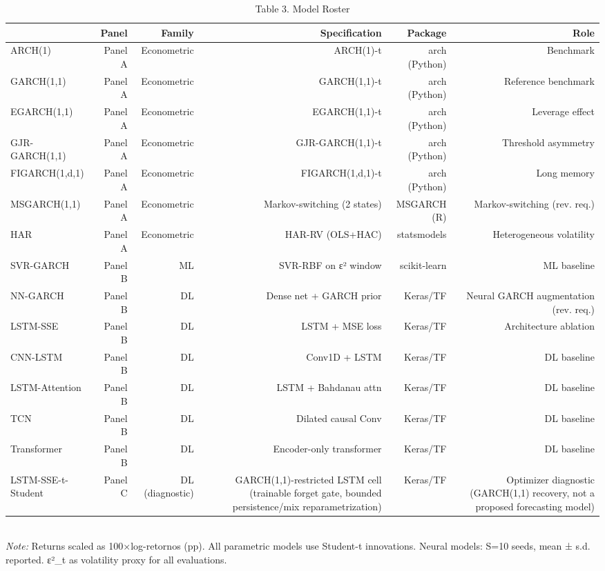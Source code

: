 \begin{table}[ht]
\centering
\caption{Table 3. Model Roster}
\label{tab:roster}
\begin{tabular}{lrrrrr}
\toprule
 & Panel & Family & Specification & Package & Role \\
\midrule
ARCH(1) & Panel A & Econometric & ARCH(1)-t & arch (Python) & Benchmark \\
GARCH(1,1) & Panel A & Econometric & GARCH(1,1)-t & arch (Python) & Reference benchmark \\
EGARCH(1,1) & Panel A & Econometric & EGARCH(1,1)-t & arch (Python) & Leverage effect \\
GJR-GARCH(1,1) & Panel A & Econometric & GJR-GARCH(1,1)-t & arch (Python) & Threshold asymmetry \\
FIGARCH(1,d,1) & Panel A & Econometric & FIGARCH(1,d,1)-t & arch (Python) & Long memory \\
MSGARCH(1,1) & Panel A & Econometric & Markov-switching (2 states) & MSGARCH (R) & Markov-switching (rev. req.) \\
HAR & Panel A & Econometric & HAR-RV (OLS+HAC) & statsmodels & Heterogeneous volatility \\
SVR-GARCH & Panel B & ML & SVR-RBF on ε² window & scikit-learn & ML baseline \\
NN-GARCH & Panel B & DL & Dense net + GARCH prior & Keras/TF & Neural GARCH augmentation (rev. req.) \\
LSTM-SSE & Panel B & DL & LSTM + MSE loss & Keras/TF & Architecture ablation \\
CNN-LSTM & Panel B & DL & Conv1D + LSTM & Keras/TF & DL baseline \\
LSTM-Attention & Panel B & DL & LSTM + Bahdanau attn & Keras/TF & DL baseline \\
TCN & Panel B & DL & Dilated causal Conv & Keras/TF & DL baseline \\
Transformer & Panel B & DL & Encoder-only transformer & Keras/TF & DL baseline \\
LSTM-SSE-t-Student & Panel C & DL (diagnostic) & GARCH(1,1)-restricted LSTM cell (trainable forget gate, bounded persistence/mix reparametrization) & Keras/TF & Optimizer diagnostic (GARCH(1,1) recovery, not a proposed forecasting model) \\
\bottomrule
\end{tabular}
\\[3pt]\footnotesize\textit{Note:} Returns scaled as 100×log-retornos (pp). All parametric models use Student-t innovations. Neural models: S=10 seeds, mean ± s.d. reported. ε²_t as volatility proxy for all evaluations.
\end{table}